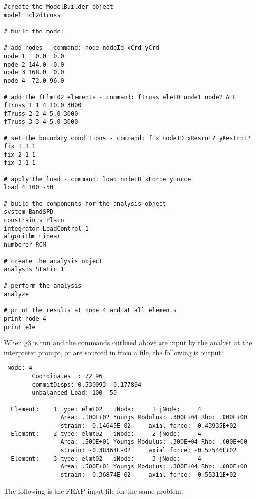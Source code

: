 \documentclass[12pt]{article}
\begin{document}
{\sf\small \begin{verbatim}
#create the ModelBuilder object
model Tcl2dTruss

# build the model 

# add nodes - command: node nodeId xCrd yCrd
node 1   0.0  0.0
node 2 144.0  0.0
node 3 168.0  0.0
node 4  72.0 96.0

# add the fElmt02 elements - command: fTruss eleID node1 node2 A E
fTruss 1 1 4 10.0 3000
fTruss 2 2 4 5.0 3000
fTruss 3 3 4 5.0 3000

# set the boundary conditions - command: fix nodeID xResrnt? yRestrnt?
fix 1 1 1 
fix 2 1 1
fix 3 1 1

# apply the load - command: load nodeID xForce yForce
load 4 100 -50

# build the components for the analysis object
system BandSPD
constraints Plain
integrator LoadControl 1
algorithm Linear
numberer RCM

# create the analysis object 
analysis Static 1

# perform the analysis
analyze

# print the results at node 4 and at all elements
print node 4
print ele
\end{verbatim}}

When g3 is run and the commands outlined above are input by the
analyst at the interpreter prompt, or are sourced in from a file, the
following is output:

{\sf\small \begin{verbatim}
 Node: 4
        Coordinates  : 72 96 
        commitDisps: 0.530093 -0.177894 
        unbalanced Load: 100 -50 

  Element:    1 type: elmt02   iNode:     1 jNode:     4
                Area: .100E+02 Youngs Modulus: .300E+04 Rho: .000E+00
                strain:  0.14645E-02     axial force:  0.43935E+02
  Element:    2 type: elmt02   iNode:     2 jNode:     4
                Area: .500E+01 Youngs Modulus: .300E+04 Rho: .000E+00
                strain: -0.38364E-02     axial force: -0.57546E+02
  Element:    3 type: elmt02   iNode:     3 jNode:     4
                Area: .500E+01 Youngs Modulus: .300E+04 Rho: .000E+00
                strain: -0.36874E-02     axial force: -0.55311E+02
\end{verbatim}}

\pagebreak
The following is the FEAP input file for the same problem:
\end{document}
